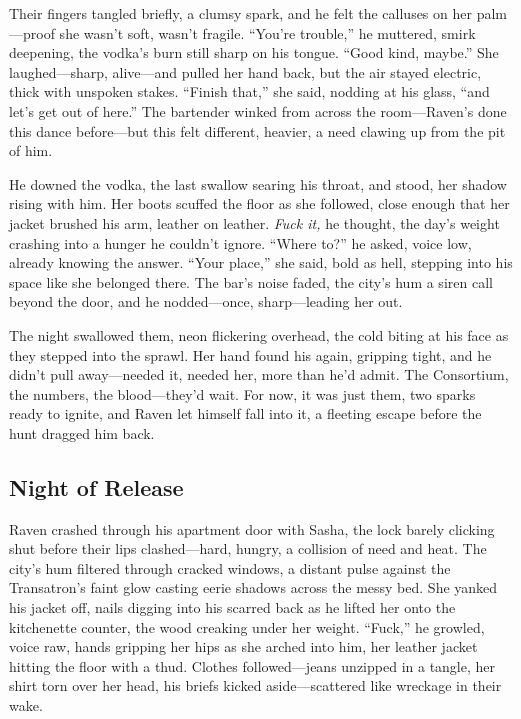 \documentclass[12pt]{book}
\begin{document}
Their fingers tangled briefly, a clumsy spark, and he felt the calluses on her palm—proof she wasn’t soft, wasn’t fragile. “You’re trouble,” he muttered, smirk deepening, the vodka’s burn still sharp on his tongue. “Good kind, maybe.” She laughed—sharp, alive—and pulled her hand back, but the air stayed electric, thick with unspoken stakes. “Finish that,” she said, nodding at his glass, “and let’s get out of here.” The bartender winked from across the room—Raven’s done this dance before—but this felt different, heavier, a need clawing up from the pit of him.

He downed the vodka, the last swallow searing his throat, and stood, her shadow rising with him. Her boots scuffed the floor as she followed, close enough that her jacket brushed his arm, leather on leather. \textit{Fuck it,} he thought, the day’s weight crashing into a hunger he couldn’t ignore. “Where to?” he asked, voice low, already knowing the answer. “Your place,” she said, bold as hell, stepping into his space like she belonged there. The bar’s noise faded, the city’s hum a siren call beyond the door, and he nodded—once, sharp—leading her out.

The night swallowed them, neon flickering overhead, the cold biting at his face as they stepped into the sprawl. Her hand found his again, gripping tight, and he didn’t pull away—needed it, needed her, more than he’d admit. The Consortium, the numbers, the blood—they’d wait. For now, it was just them, two sparks ready to ignite, and Raven let himself fall into it, a fleeting escape before the hunt dragged him back.

\subsection{Night of Release}

Raven crashed through his apartment door with Sasha, the lock barely clicking shut before their lips clashed—hard, hungry, a collision of need and heat. The city’s hum filtered through cracked windows, a distant pulse against the Transatron’s faint glow casting eerie shadows across the messy bed. She yanked his jacket off, nails digging into his scarred back as he lifted her onto the kitchenette counter, the wood creaking under her weight. “Fuck,” he growled, voice raw, hands gripping her hips as she arched into him, her leather jacket hitting the floor with a thud. Clothes followed—jeans unzipped in a tangle, her shirt torn over her head, his briefs kicked aside—scattered like wreckage in their wake.
\end{document}
